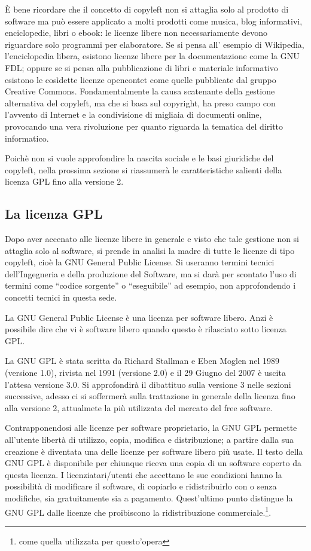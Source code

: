 \`E bene ricordare che il concetto di copyleft non si attaglia solo al prodotto di software ma può essere applicato a molti prodotti come musica, blog informativi, enciclopedie, libri o ebook: le licenze libere non necessariamente devono riguardare solo programmi per elaboratore. Se si pensa  all' esempio di Wikipedia, l'enciclopedia libera,  esistono licenze libere per la documentazione come la GNU FDL; oppure se si pensa alla pubblicazione di libri e materiale informativo esistono le cosìdette licenze opencontet come quelle pubblicate dal gruppo Creative Commons.
Fondamentalmente la causa scatenante della gestione alternativa del copyleft, ma che si basa sul copyright, ha preso campo con l'avvento di Internet e la condivisione di migliaia di documenti online, provocando una vera rivoluzione per quanto riguarda la tematica del diritto informatico.

Poichè non si vuole approfondire la nascita sociale e le basi giuridiche del copyleft, nella prossima sezione si riassumerà le caratteristiche salienti della licenza GPL fino alla versione 2.


\subsection{La licenza GPL}

Dopo aver accenato alle licenze libere in generale e visto che tale gestione non si attaglia solo al software, si prende in analisi la madre di tutte le licenze di tipo copyleft, cioè la GNU General Public License. Si useranno termini tecnici dell'Ingegneria e della produzione del Software, ma si darà per scontato l'uso di termini come ``codice sorgente'' o ``eseguibile'' ad esempio, non approfondendo i concetti tecnici in questa sede.

La GNU General Public License è una licenza per software libero. Anzi è possibile dire che vi è software libero quando questo è rilasciato sotto licenza GPL.

La GNU GPL è stata scritta da Richard Stallman e Eben Moglen nel 1989 (versione 1.0), rivista nel 1991 (versione 2.0) e il 29 Giugno del 2007 è uscita l'attesa versione 3.0. Si approfondirà il dibattituo sulla versione 3 nelle sezioni successive, adesso ci si soffermerà sulla trattazione in generale della licenza fino alla versione 2, attualmete la più utilizzata del mercato del free software.

Contrapponendosi alle licenze per software proprietario, la GNU GPL permette all'utente libertà di utilizzo, copia, modifica e distribuzione; a partire dalla sua creazione è diventata una delle licenze per software libero più usate. Il testo della GNU GPL è disponibile per chiunque riceva una copia di un software coperto da questa licenza. I licenziatari/utenti che accettano le sue condizioni hanno la possibilità di modificare il software, di copiarlo e ridistribuirlo con o senza modifiche, sia gratuitamente sia a pagamento. Quest'ultimo punto distingue la GNU GPL dalle licenze che proibiscono la ridistribuzione commerciale.\footnote{come quella utilizzata per questo'opera}.


